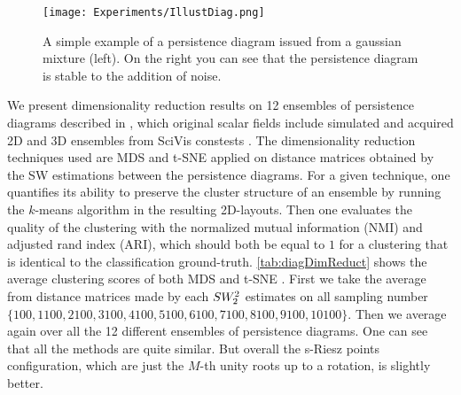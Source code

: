 \begin{figure}[h!]
\centering
\texttt{[image: Experiments/IllustDiag.png]}
\caption{A simple example of a persistence diagram issued from a gaussian 
mixture {(left).}
{On}
the right you can see that the persistence diagram 
is stable to the addition of noise.}
\label{fig:diagGauss}
\end{figure}

\noindent We present dimensionality reduction results on 12 
{ensembles}
of persistence diagrams \citep{ensembleBenchmark} described in 
\citep{pont_vis21}, which original scalar fields include simulated and acquired 
2D and 3D ensembles from SciVis constests \citep{scivisOverall}. {The 
dimensionality reduction techniques used are MDS \citep{kruskal78} and t-SNE 
\citep{tSNE} applied on distance matrices obtained by the SW estimations 
{between the persistence diagrams}. For a given technique, one 
quantifies its ability to preserve the cluster structure of an ensemble by 
running 
{the}
$k$-means algorithm in the 
{resulting}
2D-layouts.  
Then one evaluates the quality 
of the clustering with the normalized mutual information (NMI) and adjusted rand 
index (ARI){, which should both be equal to $1$ for a clustering that 
is identical to the classification ground-truth}.} \autoref{tab:diagDimReduct} 
shows the average clustering scores of both MDS \citep{kruskal78} and t-SNE 
\citep{tSNE}. First we take the average from distance matrices made by each 
$SW_2^2$ estimates on all sampling number $\{100, 1100, 2100, 3100, 4100, 5100, 
6100, 7100, 8100, 9100, 10100\}$. Then we average again over all the 12 
different 
{ensembles}
of persistence diagrams. One can see that all the methods are 
quite similar. But overall the s-Riesz points configuration, which are just the 
$M$-th unity roots up to a rotation, is slightly better.



\begin{table}[h!]
 \caption{Average NMI and ARI scores for over all 12 
 {ensembles}
 of persistence diagrams.}
 \hfill
 \label{tab:diagDimReduct}
\end{table}


